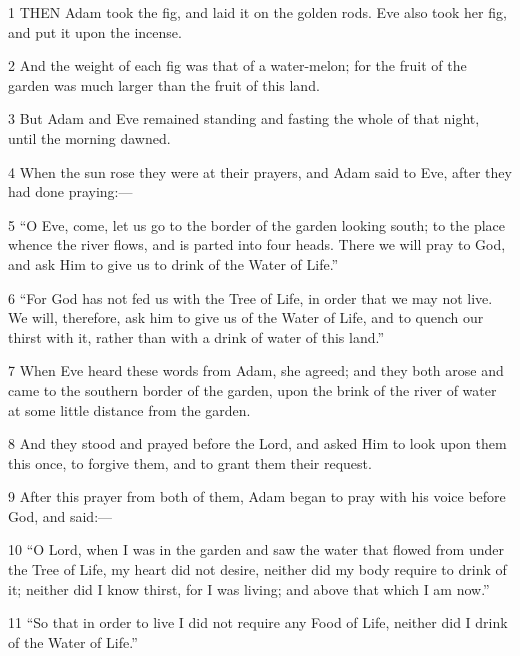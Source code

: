 \par 1 THEN Adam took the fig, and laid it on the golden rods. Eve also took her fig, and put it upon the incense.

\par 2 And the weight of each fig was that of a water-melon; for the fruit of the garden was much larger than the fruit of this land.

\par 3 But Adam and Eve remained standing and fasting the whole of that night, until the morning dawned.

\par 4 When the sun rose they were at their prayers, and Adam said to Eve, after they had done praying:—

\par 5 “O Eve, come, let us go to the border of the garden looking south; to the place whence the river flows, and is parted into four heads. There we will pray to God, and ask Him to give us to drink of the Water of Life.”

\par 6 “For God has not fed us with the Tree of Life, in order that we may not live. We will, therefore, ask him to give us of the Water of Life, and to quench our thirst with it, rather than with a drink of water of this land.”

\par 7 When Eve heard these words from Adam, she agreed; and they both arose and came to the southern border of the garden, upon the brink of the river of water at some little distance from the garden.

\par 8 And they stood and prayed before the Lord, and asked Him to look upon them this once, to forgive them, and to grant them their request.

\par 9 After this prayer from both of them, Adam began to pray with his voice before God, and said:—

\par 10 “O Lord, when I was in the garden and saw the water that flowed from under the Tree of Life, my heart did not desire, neither did my body require to drink of it; neither did I know thirst, for I was living; and above that which I am now.”

\par 11 “So that in order to live I did not require any Food of Life, neither did I drink of the Water of Life.”

